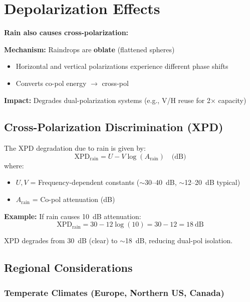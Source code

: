 \section{Depolarization Effects}

\textbf{Rain also causes cross-polarization:}

\textbf{Mechanism:} Raindrops are \textbf{oblate} (flattened spheres)
\begin{itemize}
\item Horizontal and vertical polarizations experience different phase shifts
\item Converts co-pol energy $\rightarrow$ cross-pol
\end{itemize}

\textbf{Impact:} Degrades dual-polarization systems (e.g., V/H reuse for 2$\times$ capacity)

\subsection{Cross-Polarization Discrimination (XPD)}

The XPD degradation due to rain is given by:
\begin{equation}
\text{XPD}_{\text{rain}} = U - V \log(A_{\text{rain}}) \quad \text{(dB)}
\end{equation}
where:
\begin{itemize}
\item $U, V$ = Frequency-dependent constants ($\sim$30--40~dB, $\sim$12--20~dB typical)
\item $A_{\text{rain}}$ = Co-pol attenuation (dB)
\end{itemize}

\textbf{Example:} If rain causes 10~dB attenuation:
\begin{equation}
\text{XPD}_{\text{rain}} = 30 - 12\log(10) = 30 - 12 = 18~\text{dB}
\end{equation}

XPD degrades from 30~dB (clear) to $\sim$18~dB, reducing dual-pol isolation.

\subsection{Regional Considerations}

\subsubsection{Temperate Climates (Europe, Northern US, Canada)}

